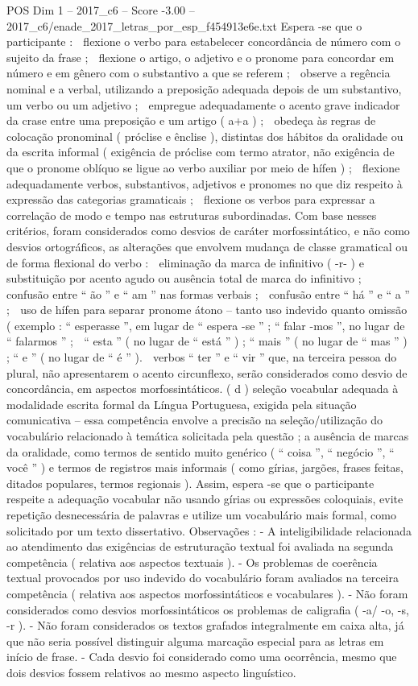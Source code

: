 \begin{textsample}{POS Dim 1 – 2017\_c6 – Score -3.00 – 2017\_c6/enade\_2017\_letras\_por\_esp\_f454913e6e.txt}
Espera -se que o participante :  flexione o verbo para estabelecer concordância de número com o sujeito da frase ;  flexione o artigo, o adjetivo e o pronome para concordar em número e em gênero com o substantivo a que se referem ;  observe a regência nominal e a verbal, utilizando a preposição adequada depois de um substantivo, um verbo ou um adjetivo ;  empregue adequadamente o acento grave indicador da crase entre uma preposição e um artigo ( a+a ) ;  obedeça às regras de colocação pronominal ( próclise e ênclise ), distintas dos hábitos da oralidade ou da escrita informal ( exigência de próclise com termo atrator, não exigência de que o pronome oblíquo se ligue ao verbo auxiliar por meio de hífen ) ;  flexione adequadamente verbos, substantivos, adjetivos e pronomes no que diz respeito à expressão das categorias gramaticais ;  flexione os verbos para expressar a correlação de modo e tempo nas estruturas subordinadas.
Com base nesses critérios, foram considerados como desvios de caráter morfossintático, e não como desvios ortográficos, as alterações que envolvem mudança de classe gramatical ou de forma flexional do verbo :  eliminação da marca de infinitivo ( -r- ) e substituição por acento agudo ou ausência total de marca do infinitivo ;  confusão entre “ ão ” e “ am ” nas formas verbais ;  confusão entre “ há ” e “ a ” ;  uso de hífen para separar pronome átono – tanto uso indevido quanto omissão ( exemplo : “ esperasse ”, em lugar de “ espera -se ” ; “ falar -mos ”, no lugar de “ falarmos ” ;  “ esta ” ( no lugar de “ está ” ) ; “ mais ” ( no lugar de “ mas ” ) ; “ e ” ( no lugar de “ é ” ).  verbos “ ter ” e “ vir ” que, na terceira pessoa do plural, não apresentarem o acento circunflexo, serão considerados como desvio de concordância, em aspectos morfossintáticos. ( d ) seleção vocabular adequada à modalidade escrita formal da Língua Portuguesa, exigida pela situação comunicativa – essa competência envolve a precisão na seleção/utilização do vocabulário relacionado à temática solicitada pela questão ; a ausência de marcas da oralidade, como termos de sentido muito genérico ( “ coisa ”, “ negócio ”, “ você ” ) e termos de registros mais informais ( como gírias, jargões, frases feitas, ditados populares, termos regionais ).
Assim, espera -se que o participante respeite a adequação vocabular não usando gírias ou expressões coloquiais, evite repetição desnecessária de palavras e utilize um vocabulário mais formal, como solicitado por um texto dissertativo.
Observações : - A inteligibilidade relacionada ao atendimento das exigências de estruturação textual foi avaliada na segunda competência ( relativa aos aspectos textuais ). - Os problemas de coerência textual provocados por uso indevido do vocabulário foram avaliados na terceira competência ( relativa aos aspectos morfossintáticos e vocabulares ). - Não foram considerados como desvios morfossintáticos os problemas de caligrafia ( -a/ -o, -s, -r ). - Não foram considerados os textos grafados integralmente em caixa alta, já que não seria possível distinguir alguma marcação especial para as letras em início de frase. - Cada desvio foi considerado como uma ocorrência, mesmo que dois desvios fossem relativos ao mesmo aspecto linguístico.

\end{textsample}
